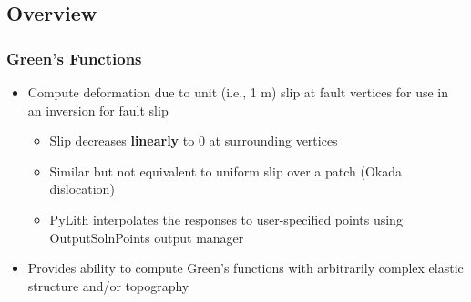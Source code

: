 \documentclass{beamer}
\newcommand{\pylith}[1]{{\color{green}#1}}
\begin{document}
\subsection{Overview}

\begin{frame}
  \frametitle{Green's Functions}
  \summary{}

  \begin{itemize}
  \item Compute deformation due to unit (i.e., 1 m) slip at fault
    vertices for use in an inversion for fault slip
    \begin{itemize}
    \item Slip decreases {\bf linearly} to 0 at surrounding vertices
    \item Similar but not equivalent to uniform slip over a patch
      (Okada dislocation)
    \item PyLith interpolates the responses to user-specified points
      using \pylith{OutputSolnPoints} output manager
    \end{itemize}
  \item Provides ability to compute Green's functions with arbitrarily
    complex elastic structure and/or topography
  \end{itemize}
  
\end{frame}


\end{document}
